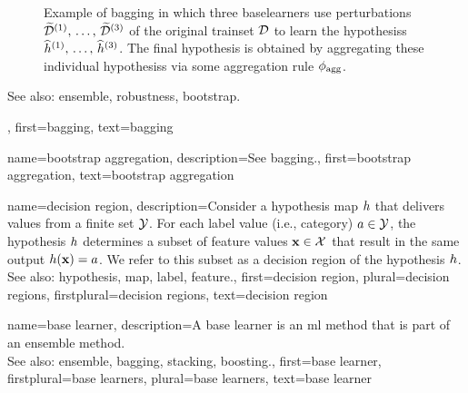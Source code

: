 {{\begin{figure}[H]
\begin{center}
		\caption{Example of bagging in which three \glspl{baselearner} use perturbations  
			$\widetilde{\mathcal{D}}^{(1)},\,\ldots,\,\widetilde{\mathcal{D}}^{(3)}$ of 
			the original \gls{trainset} $\mathcal{D}$ to learn the \glspl{hypothesis} 
			$\widehat{h}^{(1)},\,\ldots,\,\widehat{h}^{(3)}$. The final 
			\gls{hypothesis} is obtained by aggregating these individual \glspl{hypothesis} 
			via some aggregation rule $\phi_{\rm agg}$.}
			\end{center}
		\end{figure}
		See also: \gls{ensemble}, \gls{robustness}, \gls{bootstrap}.},
	first={bagging},
	text={bagging}
}

{name={bootstrap aggregation}, 
	description={See \gls{bagging}.},
 	first={bootstrap aggregation},
 	text={bootstrap aggregation} 
}	

{name={decision region},
	description={Consider 
		a \gls{hypothesis} \gls{map} $h$ that delivers values from a finite set $\mathcal{Y}$. 
		For each \gls{label} value (i.e., category) $a \in \mathcal{Y}$, the \gls{hypothesis} $h$ 
		determines a subset of \gls{feature} values ${\bf x} \in \mathcal{X}$ that result 
		in the same \gls{output} $h({\bf x})=a$. We refer to this subset as a decision 
		region of the \gls{hypothesis} $h$. 
		\\
		See also: \gls{hypothesis}, \gls{map}, \gls{label}, \gls{feature}.},
	first={decision region},
	plural={decision regions}, 
	firstplural={decision regions}, 
	text={decision region} 
}

{name={base learner}, 
	description={A base learner is an \gls{ml} method 
         	that is part of an \gls{ensemble} method. 
		\\
		See also: \gls{ensemble}, \gls{bagging}, \gls{stacking}, \gls{boosting}.},
	first={base learner},
	firstplural={base learners},
	plural={base learners},
	text={base learner} 
}	

